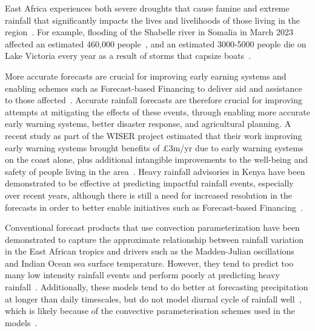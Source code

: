 \documentclass{article}
\begin{document}
East Africa experiences both severe droughts that cause famine \citep{gebremeskel_haile_droughts_2019} and extreme rainfall that significantly impacts the lives and livelihoods of those living in the region~\citep{kilavi_extreme_2018,wainwright_extreme_2021}. For example, flooding of the Shabelle river in Somalia in March 2023 affected an estimated 460,000 people~\citep{floodlist_somalia_2023}, and an estimated 3000-5000 people die on Lake Victoria every year as a result of storms that capsize boats~\citep{watkiss_socio-economic_2020}. 

More accurate forecasts are crucial for improving early earning systems and enabling schemes such as Forecast-based Financing to deliver aid and assistance to those affected~\citep{wilkinson_forecasting_2018}. Accurate rainfall forecasts are therefore crucial for improving attempts at mitigating the effects of these events, through enabling more accurate early warning systems, better disaster response, and agricultural planning. A recent study as part of the WISER project estimated that their work improving early warning systems brought benefits of £3m/yr due to early warning systems on the coast alone, plus additional intangible improvements to the well-being and safety of people living in the area~\citep{watkiss_socio-economic_2021}. Heavy rainfall advisories in Kenya have been demonstrated to be effective at predicting impactful rainfall events, especially over recent years, although there is still a need for increased resolution in the forecasts in order to better enable initiatives such as Forecast-based Financing~\citep{macleod_are_2021}.


Conventional forecast products that use convection parameterization have been demonstrated to capture the approximate relationship between rainfall variation in the East African tropics and drivers such as the Madden-Julian oscillations and Indian Ocean sea surface temperature. However, they tend to predict too many low intensity rainfall events and perform poorly at predicting heavy rainfall~\citep{woodhams_what_2018, chamberlain_forecasting_2014, vogel_skill_2018, walker_skill_2019, bechtold_representing_2014, haiden_intercomparison_2012}. Additionally, these models tend to do better at forecasting precipitation at longer than daily timescales, but do not model diurnal cycle of rainfall well~\citep{kim_tropical_2013, macleod_drivers_2021, bechtold_simulation_2004}, which is likely because of the convective parameterisation schemes used in the models~\citep{vogel_skill_2018, marsham_role_2013, bechtold_representing_2014}. 
\end{document}
